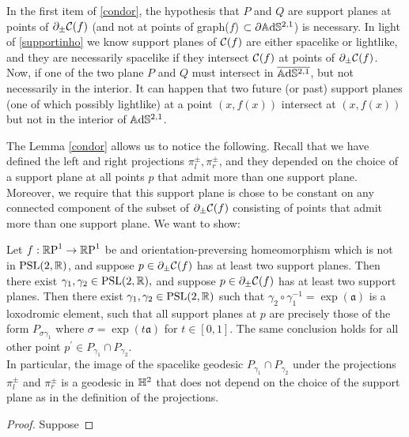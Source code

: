 \begin{observation}
In the first item of \ref{condor}, the hypothesis that $P$ and $Q$ are support planes at points of $\partial_\pm\CF$ (and not at points of graph($f$) $\subset\partial\A^{2,1}$) is necessary. In light of \ref{supportinho} we know support planes of $\CF$ are either spacelike or lightlike, and they are necessarily spacelike if they intersect $\CF$ at points of $\partial_\pm\CF$. \\
Now, if one of the two plane $P$ and $Q$ must intersect in $\overline{\A^{2,1}}$, but not necessarily in the interior. It can happen that two future (or past) support planes (one of which possibly lightlike) at a point $(x,f(x))$ intersect at $(x,f(x))$ but not in the interior of $\A^{2,1}$.
\end{observation}
 
The Lemma \ref{condor} allows us to notice the following. Recall that we have defined the left and right projections $\pi_l^\pm,\pi_r^\pm$, and they depended on the choice of a support plane at all points $p$ that admit more than one support plane. Moreover, we require that this support plane is chose to be constant on any connected component of the subset of $\partial_\pm\CF$ consisting of points that admit more than one support plane. We want to show:

\begin{corollary}
    Let $f:\S\to\S$ be and orientation-preversing homeomorphism which is not in $\PSL$, and suppose $p\in \partial_\pm\CF$ has at least two support planes. Then there exist $\gamma_1,\gamma_2\in \PSL,$ and suppose $p\in\partial_\pm\CF$ has at least two support planes. Then there exist $\gamma_1,\gamma_2\in\PSL$ such that $\gamma_2\circ\gamma_1^{-1}=\exp(\mathfrak{a})$ is a loxodromic element, such that all support planes at $p$ are precisely those of the form $P_{\sigma\gamma_1}$ where $\sigma=\exp(t\mathfrak{a})$ for $t\in [0,1].$ The same conclusion holds for all other point $p^{\prime}\in P_{\gamma_1}\cap P_{\gamma_2}$. \\
    In particular, the image of the spacelike geodesic $P_{\gamma_1}\cap P_{\gamma_2}$ under the projections $\pi_l^\pm$ and $\pi_r^\pm$ is a geodesic in $\H^2$ that does not depend on the choice of the support plane as in the definition of the projections.  
\end{corollary}

\begin{proof}
Suppose\end{proof}

